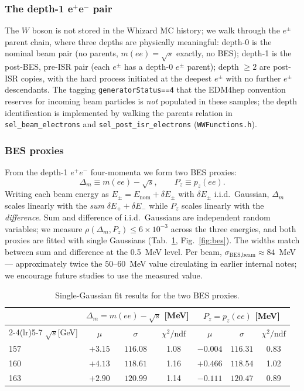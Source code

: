 \documentclass[11pt,a4paper]{article}
\newcommand{\sqs}{\ensuremath{\sqrt{s}}\xspace}
\newcommand{\codename}[1]{\texttt{\small #1}}
\newcommand{\chitndf}{\ensuremath{\chi^2/\text{ndf}}\xspace}
\begin{document}
\subsubsection{The depth-1 e$^+$e$^-$ pair}\label{sec:bes-chain}

The $W$ boson is not stored in the Whizard MC history; we walk through
the $e^\pm$ parent chain, where three depths are physically meaningful:
depth-0 is the nominal beam pair (no parents, $m(ee)=\sqs$ exactly,
no BES); depth-1 is the post-BES, pre-ISR pair (each $e^\pm$ has a
depth-0 $e^\pm$ parent); depth $\ge 2$ are post-ISR copies, with the
hard process initiated at the deepest $e^\pm$ with no further $e^\pm$
descendants. The tagging \codename{generatorStatus==4} that the EDM4hep
convention reserves for incoming beam particles is \emph{not} populated
in these samples; the depth identification is implemented by walking
the parents relation in
\codename{sel\_beam\_electrons} and
\codename{sel\_post\_isr\_electrons} (\codename{WWFunctions.h}).

\subsubsection{BES proxies}

From the depth-1 $e^+e^-$ four-momenta we form two BES proxies:
\begin{equation}
  \Delta_m \equiv m(ee)-\sqs,\qquad
  P_z \equiv p_z(ee).
\end{equation}
Writing each beam energy as $E_\pm = E_\text{nom} + \delta E_\pm$ with
$\delta E_\pm$ i.i.d.\ Gaussian, $\Delta_m$ scales linearly with the
\emph{sum} $\delta E_+ + \delta E_-$ while $P_z$ scales linearly with
the \emph{difference}. Sum and difference of i.i.d.\ Gaussians are
independent random variables; we measure $\rho(\Delta_m, P_z) \le 6
\times 10^{-3}$ across the three energies, and both proxies are fitted
with single Gaussians (Tab.~\ref{tab:bes-fits}, Fig.~\ref{fig:bes}).
The widths match between sum and difference at the 0.5~MeV level. Per
beam, $\sigma_\text{BES,beam} \approx 84$~MeV --- approximately twice
the $50$--$60$~MeV value circulating in earlier internal notes; we
encourage future studies to use the measured value.

\begin{table}[ht]
  \centering\small
  \caption{Single-Gaussian fit results for the two BES proxies.}
  \label{tab:bes-fits}
  \begin{tabular}{lcccccc}\toprule
    & \multicolumn{3}{c}{$\Delta_m = m(ee)-\sqs$ [MeV]}
    & \multicolumn{3}{c}{$P_z = p_z(ee)$ [MeV]} \\
    \cmidrule(lr){2-4}\cmidrule(lr){5-7}
    \sqs [GeV] & $\mu$ & $\sigma$ & \chitndf & $\mu$ & $\sigma$ & \chitndf \\\midrule
    157 & $+3.15$ & $116.08$ & 1.08 & $-0.004$ & $116.31$ & 0.83 \\
    160 & $+4.13$ & $118.61$ & 1.16 & $+0.466$ & $118.54$ & 1.02 \\
    163 & $+2.90$ & $120.99$ & 1.14 & $-0.111$ & $120.47$ & 0.89 \\
    \bottomrule
  \end{tabular}
\end{table}
\end{document}
